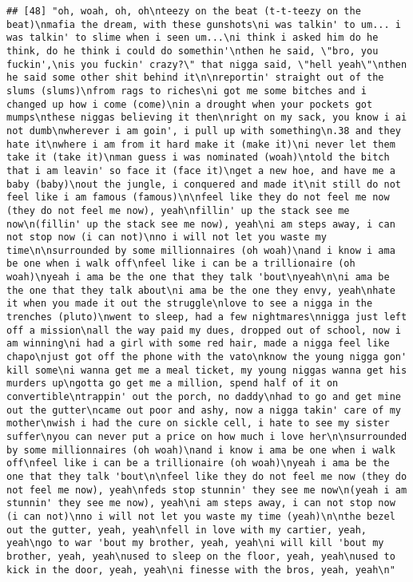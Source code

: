 \documentclass[]{article}
\begin{document}
\begin{verbatim}
## [48] "oh, woah, oh, oh\nteezy on the beat (t-t-teezy on the beat)\nmafia the dream, with these gunshots\ni was talkin' to um... i was talkin' to slime when i seen um...\ni think i asked him do he think, do he think i could do somethin'\nthen he said, \"bro, you fuckin',\nis you fuckin' crazy?\" that nigga said, \"hell yeah\"\nthen he said some other shit behind it\n\nreportin' straight out of the slums (slums)\nfrom rags to riches\ni got me some bitches and i changed up how i come (come)\nin a drought when your pockets got mumps\nthese niggas believing it then\nright on my sack, you know i ai not dumb\nwherever i am goin', i pull up with something\n.38 and they hate it\nwhere i am from it hard make it (make it)\ni never let them take it (take it)\nman guess i was nominated (woah)\ntold the bitch that i am leavin' so face it (face it)\nget a new hoe, and have me a baby (baby)\nout the jungle, i conquered and made it\nit still do not feel like i am famous (famous)\n\nfeel like they do not feel me now (they do not feel me now), yeah\nfillin' up the stack see me now\n(fillin' up the stack see me now), yeah\ni am steps away, i can not stop now (i can not)\nno i will not let you waste my time\n\nsurrounded by some millionnaires (oh woah)\nand i know i ama be one when i walk off\nfeel like i can be a trillionaire (oh woah)\nyeah i ama be the one that they talk 'bout\nyeah\n\ni ama be the one that they talk about\ni ama be the one they envy, yeah\nhate it when you made it out the struggle\nlove to see a nigga in the trenches (pluto)\nwent to sleep, had a few nightmares\nnigga just left off a mission\nall the way paid my dues, dropped out of school, now i am winning\ni had a girl with some red hair, made a nigga feel like chapo\njust got off the phone with the vato\nknow the young nigga gon' kill some\ni wanna get me a meal ticket, my young niggas wanna get his murders up\ngotta go get me a million, spend half of it on convertible\ntrappin' out the porch, no daddy\nhad to go and get mine out the gutter\ncame out poor and ashy, now a nigga takin' care of my mother\nwish i had the cure on sickle cell, i hate to see my sister suffer\nyou can never put a price on how much i love her\n\nsurrounded by some millionnaires (oh woah)\nand i know i ama be one when i walk off\nfeel like i can be a trillionaire (oh woah)\nyeah i ama be the one that they talk 'bout\n\nfeel like they do not feel me now (they do not feel me now), yeah\nfeds stop stunnin' they see me now\n(yeah i am stunnin' they see me now), yeah\ni am steps away, i can not stop now (i can not)\nno i will not let you waste my time (yeah)\n\nthe bezel out the gutter, yeah, yeah\nfell in love with my cartier, yeah, yeah\ngo to war 'bout my brother, yeah, yeah\ni will kill 'bout my brother, yeah, yeah\nused to sleep on the floor, yeah, yeah\nused to kick in the door, yeah, yeah\ni finesse with the bros, yeah, yeah\n"                                                                                                                                                                                                                                                                                                                                                                                                                        
\end{verbatim}
\end{document}
